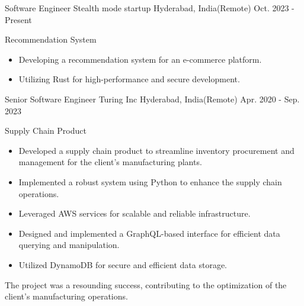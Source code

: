 

\begin{cventries}

  \cventry
  {Software Engineer} %
  {Stealth mode startup} %
  {Hyderabad, India(Remote)} %
  {Oct. 2023 - Present} %
  {
    \begin{cvitems} %
      \item {Recommendation System}
      \begin {itemize}
        \item Developing a recommendation system for an e-commerce platform.
        \item Utilizing Rust for high-performance and secure development.
      \end{itemize}
    \end{cvitems}
  }
  \cventry
    {Senior Software Engineer} %
    {Turing Inc} %
    {Hyderabad, India(Remote)} %
    {Apr. 2020 - Sep. 2023} %
    {
      \begin{cvitems} %
        \item {Supply Chain Product}
        \begin {itemize}
          \item Developed a supply chain product to streamline inventory procurement and management for the client's manufacturing plants.
          \item Implemented a robust system using Python to enhance the supply chain operations.
          \item Leveraged AWS services for scalable and reliable infrastructure.
          \item Designed and implemented a GraphQL-based interface for efficient data querying and manipulation.
          \item Utilized DynamoDB for secure and efficient data storage.
          \end{itemize}
        The project was a resounding success, contributing to the optimization of the client's manufacturing operations.

\end{cvitems}}
\end{cventries}
